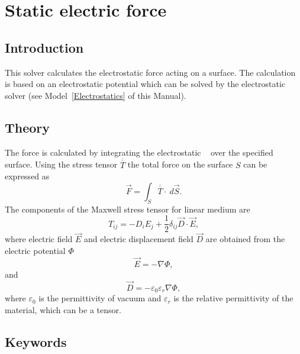 \chapter{Static electric force}
\noindent
{}
\begin{versiona}


\section{Introduction}

This solver calculates the electrostatic force acting on a
surface. The calculation is based on an electrostatic potential which
can be solved by the electrostatic solver (see Model~\ref{Electrostatics}
of this Manual).


\section{Theory}

The force is calculated by integrating the electrostatic ~\cite{vanderlinde93} over the specified surface. Using
the stress tensor $\overline{\overline T}$ the total force on the
surface $S$ can be expressed as
\begin{equation}
\Vec{F} = \int_S \overline{\overline T}\cdot~d\Vec{S}.
\end{equation}
The components of the Maxwell stress tensor for linear medium are
\begin{equation}
T_{ij} = -D_iE_j + \frac{1}{2}\delta_{ij}\Vec{D}\cdot\Vec{E},
\end{equation}
where electric field $\vec{E}$ and electric displacement field
$\vec{D}$ are obtained from the electric potential $\Phi$
\begin{equation}
\vec{E} = -\nabla\Phi,
\end{equation}
and
\begin{equation}
\vec{D} = -\varepsilon_0\varepsilon_r\nabla\Phi,
\end{equation}
where $\varepsilon_0$ is the permittivity of vacuum and
$\varepsilon_r$ is the relative permittivity of the material, which
can be a tensor.


\section{Keywords}
\end{versiona}

